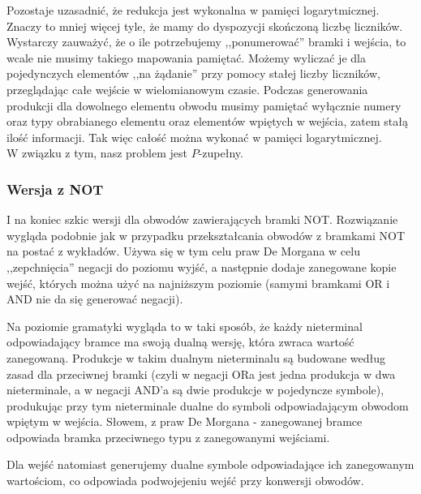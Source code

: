 \documentclass[a4paper,11pt]{article}
\begin{document}
Pozostaje uzasadnić, że redukcja jest wykonalna w pamięci logarytmicznej. Znaczy
to mniej więcej tyle, że mamy do dyspozycji skończoną liczbę liczników.
Wystarczy zauważyć, że o ile potrzebujemy ,,ponumerować'' bramki i wejścia, to
wcale nie musimy takiego mapowania pamiętać. Możemy wyliczać je dla
pojedynczych elementów ,,na żądanie'' przy pomocy stałej liczby liczników,
przeglądając całe wejście w wielomianowym czasie. Podczas generowania produkcji
dla dowolnego elementu obwodu musimy pamiętać wyłącznie numery oraz typy
obrabianego elementu oraz elementów wpiętych w wejścia, zatem stałą ilość
informacji. Tak więc całość można wykonać w pamięci logarytmicznej. \\

W związku z tym, nasz problem jest $P$-zupełny.



\subsubsection*{Wersja z NOT}

I na koniec szkic wersji dla obwodów zawierających bramki NOT. Rozwiązanie
wygląda podobnie jak w przypadku przekształcania obwodów z bramkami NOT na
postać z wykładów. Używa się w tym celu praw De Morgana w celu ,,zepchnięcia''
negacji do poziomu wyjść, a następnie dodaje zanegowane kopie wejść, których
można użyć na najniższym poziomie (samymi bramkami OR i AND nie da się generować
negacji).

Na poziomie gramatyki wygląda to w taki sposób, że każdy nieterminal
odpowiadający bramce ma swoją dualną wersję, która zwraca wartość zanegowaną.
Produkcje w takim dualnym nieterminalu są budowane według zasad dla przeciwnej
bramki (czyli w negacji ORa jest jedna produkcja w dwa nieterminale,
a w negacji AND'a są dwie produkcje w pojedyncze symbole), produkując przy tym
nieterminale dualne do symboli odpowiadającym obwodom wpiętym w wejścia.
Słowem, z praw De Morgana - zanegowanej bramce odpowiada bramka przeciwnego
typu z zanegowanymi wejściami.

Dla wejść natomiast generujemy dualne symbole odpowiadające ich zanegowanym
wartościom, co odpowiada podwojejeniu wejść przy konwersji obwodów.
\end{document}
